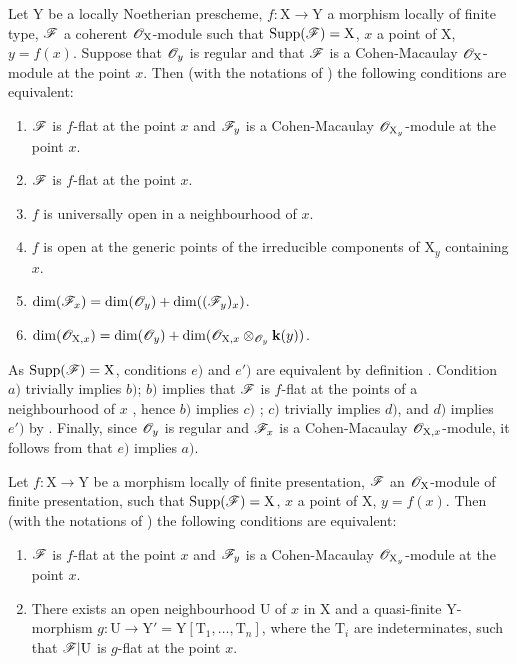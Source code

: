 \begin{proposition}[15.4.2]
\label{IV.15.4.2}
Let $\mathrm{Y}$ be a locally Noetherian prescheme, $f:\mathrm{X}\to\mathrm{Y}$ a morphism locally of finite type, $\mathscr{F}$ a coherent $\mathscr{O}_\mathrm{X}$-module such that $\operatorname{Supp}(\mathscr{F})=\mathrm{X}$, $x$ a point of $\mathrm{X}$, $y=f(x)$.
Suppose that $\mathscr{O}_y$ is regular and that $\mathscr{F}$ is a Cohen-Macaulay $\mathscr{O}_\mathrm{X}$-module at the point $x$.
Then (with the notations of ) the following conditions are equivalent:
\begin{enumerate}[label=\emph{\alph*})]
  \item $\mathscr{F}$ is $f$-flat at the point $x$ and $\mathscr{F}_y$ is a Cohen-Macaulay $\mathscr{O}_{\mathrm{X}_y}$-module at the point $x$.
  \item $\mathscr{F}$ is $f$-flat at the point $x$.
  \item $f$ is universally open in a neighbourhood of $x$.
  \item $f$ is open at the generic points of the irreducible components of $\mathrm{X}_y$ containing $x$.
  \item $\dim(\mathscr{F}_x)=\dim(\mathscr{O}_y)+\dim((\mathscr{F}_y)_x)$.
  \item[\emph{e}$'$)] $\dim(\mathscr{O}_{\mathrm{X},x})=\dim(\mathscr{O}_y)+\dim(\mathscr{O}_{\mathrm{X},x}\otimes_{\mathscr{O}_y}\mathbf{k}(y))$.
\end{enumerate}
As $\operatorname{Supp}(\mathscr{F})=\mathrm{X}$, conditions $e)$ and $e')$ are equivalent by definition .
Condition $a)$ trivially implies $b)$; $b)$ implies that $\mathscr{F}$ is $f$-flat at the points of a neighbourhood of $x$ , hence $b)$ implies $c)$ ; $c)$ trivially implies $d)$, and $d)$ implies $e')$ by .
Finally, since $\mathscr{O}_y$ is regular and $\mathscr{F}_x$ is a Cohen-Macaulay $\mathscr{O}_{\mathrm{X},x}$-module, it follows from  that $e)$ implies $a)$.
\end{proposition}

\begin{proposition}[15.4.3]
\label{IV.15.4.3}
Let $f:\mathrm{X}\to\mathrm{Y}$ be a morphism locally of finite presentation, $\mathscr{F}$ an $\mathscr{O}_\mathrm{X}$-module of finite presentation, such that $\operatorname{Supp}(\mathscr{F})=\mathrm{X}$, $x$ a point of $\mathrm{X}$, $y=f(x)$.
Then (with the notations of ) the following conditions are equivalent:
\begin{enumerate}[label=\emph{\alph*})]
  \item $\mathscr{F}$ is $f$-flat at the point $x$ and $\mathscr{F}_y$ is a Cohen-Macaulay $\mathscr{O}_{\mathrm{X}_y}$-module at the point $x$.
  \item There exists an open neighbourhood $\mathrm{U}$ of $x$ in $\mathrm{X}$ and a quasi-finite $\mathrm{Y}$-morphism $g:\mathrm{U}\to\mathrm{Y}'=\mathrm{Y}[\mathrm{T}_1,\ldots,\mathrm{T}_n]$, where the $\mathrm{T}_i$ are indeterminates, such that $\mathscr{F}|\mathrm{U}$ is $g$-flat at the point $x$.
\end{enumerate}
\end{proposition}

